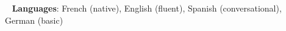 \documentclass[letterpaper,11pt]{article}
\begin{document}
\sffamily







% 


\vspace{-14pt}
\faGlobe ~ \textbf{Languages}{: French (native), English (fluent), Spanish (conversational), German (basic)} \\
\end{document}
